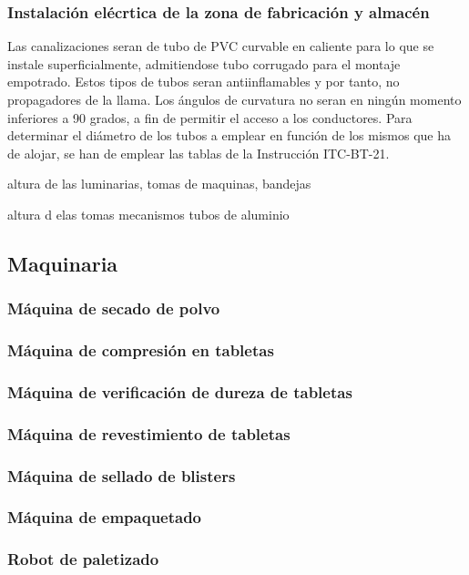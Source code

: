 \subsubsection{Instalación elécrtica de la zona de fabricación y almacén}

Las canalizaciones seran de tubo de PVC curvable en caliente para lo que se instale superficialmente, admitiendose tubo corrugado para el montaje empotrado. Estos tipos de tubos seran antiinflamables y por tanto, no propagadores de la llama.
Los ángulos de curvatura no seran en ningún momento inferiores a 90 grados, a fin de permitir el acceso a los conductores.
Para determinar el diámetro de los tubos a emplear en función de los mismos que ha de alojar, se han de emplear las tablas de la Instrucción ITC-BT-21.




altura de las luminarias, tomas de maquinas, bandejas

altura d elas tomas mecanismos tubos de aluminio



\subsection{Maquinaria}
	\subsubsection{Máquina de secado de polvo}
	\subsubsection{Máquina de compresión en tabletas}
	\subsubsection{Máquina de verificación de dureza de tabletas}
	\subsubsection{Máquina de revestimiento de tabletas}
	\subsubsection{Máquina de sellado de blisters }
	
	\subsubsection{Máquina de empaquetado}
	\subsubsection{Robot de paletizado}
